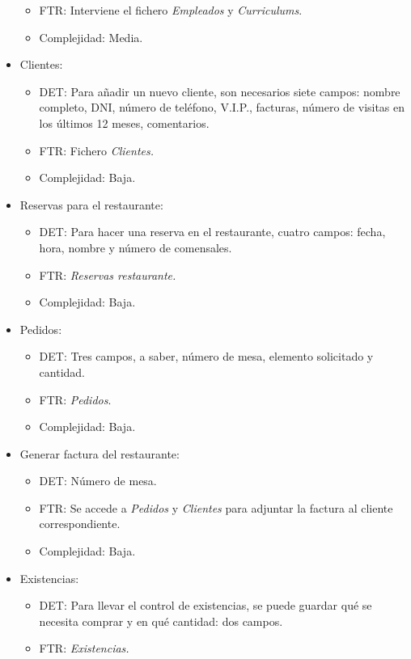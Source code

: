 \documentclass[spanish,a4paper,12pt]{report}	%
\begin{document}
\begin{itemize}
\begin{itemize}
			\item{FTR:} Interviene el fichero \textit{Empleados} y \textit{Curriculums}.
			\item{Complejidad:} Media.
		\end{itemize}
		\item{Clientes:} 
		\begin{itemize}
 			\item{DET:} Para añadir un nuevo cliente, son necesarios siete campos: nombre completo, DNI, número de teléfono, V.I.P., facturas, número de visitas en los últimos 12 meses, comentarios.
			\item{FTR:} Fichero \textit{Clientes.}
			\item{Complejidad:} Baja.
		\end{itemize}
		\item{Reservas para el restaurante:} 
		\begin{itemize}
 			\item{DET:} Para hacer una reserva en el restaurante, cuatro campos: fecha, hora, nombre y número de comensales.
			\item{FTR:} \textit{Reservas restaurante.}
			\item{Complejidad:} Baja.
		\end{itemize}
		\item{Pedidos:} 
		\begin{itemize}
 			\item{DET:} Tres campos, a saber, número de mesa, elemento solicitado y cantidad.
			\item{FTR:} \textit{Pedidos}.
			\item{Complejidad:} Baja.
		\end{itemize}
		\item{Generar factura del restaurante:} 
		\begin{itemize}
 			\item{DET:} Número de mesa.
			\item{FTR:} Se accede a \textit{Pedidos} y \textit{Clientes} para adjuntar la factura al cliente correspondiente.
			\item{Complejidad:} Baja.
		\end{itemize}
		\item{Existencias:} 
		\begin{itemize}
 			\item{DET:} Para llevar el control de existencias, se puede guardar qué se necesita comprar y en qué cantidad: dos campos.
			\item{FTR:} \textit{Existencias.}

\end{itemize}
\end{itemize}
\end{document}
